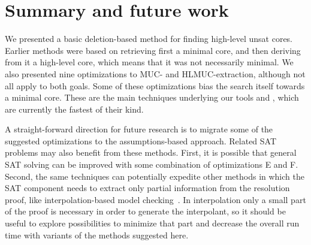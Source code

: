 \documentclass[twoside,11pt]{article}
\newcommand\haifamuc{\tool{HaifaMUC}\xspace}
\newcommand\haifahlmuc{\tool{HaifaHLMUC}\xspace}
\begin{document}
\section{Summary and future work}
We presented a basic deletion-based method for finding high-level unsat cores. Earlier methods were based on retrieving first a minimal core, and then deriving from it a high-level core, which means that it was not necessarily minimal.
We also presented nine optimizations to MUC- and HLMUC-extraction, although not all
apply to both goals. Some of these optimizations bias the search itself towards a minimal core. These are the main techniques underlying our tools
\haifamuc and \haifahlmuc, which are currently the fastest of their kind.

A straight-forward direction for future research is to migrate some of the
suggested optimizations to the assumptions-based approach. Related SAT
problems may also benefit from these methods. First, it is possible that
general SAT solving can be improved with some combination of optimizations
E and F. Second, the same techniques can potentially expedite
other methods in which the SAT component needs to extract only partial
information from the resolution proof, like interpolation-based model
checking~\cite{M03}. In interpolation only a small part of the proof
is necessary in order to generate the interpolant, so it should be useful to explore
possibilities to minimize that part and decrease the overall run time with
variants of the methods suggested here.




\end{document}
